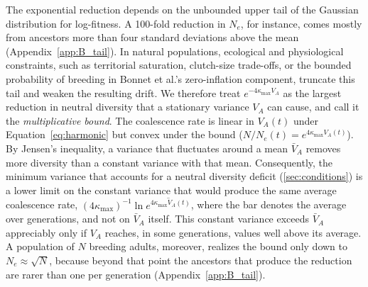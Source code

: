 \documentclass{article}
\begin{document}
The exponential reduction depends on the unbounded upper tail of the Gaussian distribution for log-fitness. A 100-fold reduction in $N_e$, for instance, comes mostly from ancestors more than four standard deviations above the mean (Appendix~\ref{app:B_tail}). In natural populations, ecological and physiological constraints, such as territorial saturation, clutch-size trade-offs, or the bounded probability of breeding in Bonnet et al.'s zero-inflation component, truncate this tail and weaken the resulting drift. We therefore treat $e^{-4\kappa_\text{max}V_A}$ as the largest reduction in neutral diversity that a stationary variance $V_A$ can cause, and call it the \emph{multiplicative bound}. The coalescence rate is linear in $V_A(t)$ under Equation~\eqref{eq:harmonic} but convex under the bound ($N/N_e(t) = e^{4\kappa_\text{max} V_A(t)}$). By Jensen's inequality, a variance that fluctuates around a mean $\bar{V}_A$ removes more diversity than a constant variance with that mean. Consequently, the minimum variance that accounts for a neutral diversity deficit (\autoref{sec:conditions}) is a lower limit on the constant variance that would produce the same average coalescence rate, $(4\kappa_\text{max})^{-1}\ln \overline{e^{4\kappa_\text{max} V_A(t)}}$, where the bar denotes the average over generations, and not on $\bar{V}_A$ itself. This constant variance exceeds $\bar{V}_A$ appreciably only if $V_A$ reaches, in some generations, values well above its average. A population of $N$ breeding adults, moreover, realizes the bound only down to $N_e \approx \sqrt{N}$, because beyond that point the ancestors that produce the reduction are rarer than one per generation (Appendix~\ref{app:B_tail}).
\end{document}
